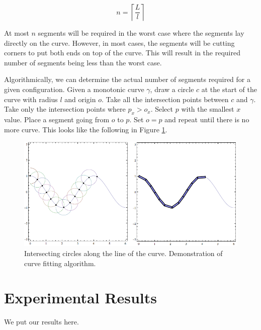 \begin{equation}
n = \left \lceil \frac{L}{l} \right \rceil
\end{equation}

At most $n$ segments will be required in the worst case where the segments lay directly on the curve.  However, in most cases, the segments will be cutting corners to put both ends on top of the curve.  This will result in the required number of segments being less than the worst case.

Algorithmically, we can determine the actual number of segments required for a given configuration.  Given a monotonic curve $\gamma$, draw a circle $c$ at the start of the curve with radius $l$ and origin $o$.  Take all the intersection points between $c$ and $\gamma$. Take only the intersection points where $p_x > o_x$.  Select $p$ with the smallest $x$ value.  Place a segment going from $o$ to $p$.  Set $o = p$ and repeat until there is no more curve.  This looks like the following in Figure \ref{plot_3}.

\begin{figure}[htb]
\begin{center}
\includegraphics[scale=0.6]{2011_01_28_FitAlgorithm_Segs}
\end{center}
\caption{Intersecting circles along the line of the curve.  Demonstration of curve fitting algorithm.}
\label{plot_3}
\end{figure}




\section{Experimental Results}

We put our results here.



